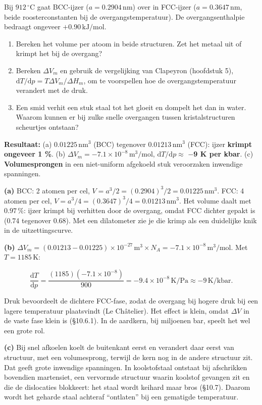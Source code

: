 \begin{oefening}
Bij \(912\,^\circ\mathrm{C}\) gaat BCC-ijzer (\(a = 0.2904\,\mathrm{nm}\)) over in FCC-ijzer (\(a = 0.3647\,\mathrm{nm}\), beide roosterconstanten bij de overgangstemperatuur). De overgangsenthalpie bedraagt ongeveer \(+0.90\,\mathrm{kJ/mol}\).

\begin{enumerate}
\item[(a)]
  Bereken het volume per atoom in beide structuren. Zet het metaal uit of krimpt het bij de overgang?
\item[(b)]
  Bereken \(\Delta V_m\) en gebruik de vergelijking van Clapeyron (hoofdstuk 5), \(\mathrm{d}T/\mathrm{d}p = T\Delta V_m/\Delta H_m\), om te voorspellen hoe de overgangstemperatuur verandert met de druk.
\item[(c)]
  Een smid verhit een stuk staal tot het gloeit en dompelt het dan in water. Waarom kunnen er bij zulke snelle overgangen tussen kristalstructuren scheurtjes ontstaan?
\end{enumerate}
\end{oefening}
\begin{oplossing}
\textbf{Resultaat:} (a) \(0.01225\,\mathrm{nm^3}\) (BCC) tegenover \(0.01213\,\mathrm{nm^3}\) (FCC): ijzer \textbf{krimpt ongeveer 1 \%}. (b) \(\Delta V_m = -7.1\times10^{-8}\,\mathrm{m^3/mol}\), \(\mathrm{d}T/\mathrm{d}p \approx\) \textbf{\ensuremath{-}9 K per kbar}. (c) \textbf{Volumesprongen} in een niet-uniform afgekoeld stuk veroorzaken inwendige spanningen.

\textbf{(a)} BCC: 2 atomen per cel, \(V = a^3/2 = (0.2904)^3/2 = 0.01225\,\mathrm{nm^3}\). FCC: 4 atomen per cel, \(V = a^3/4 = (0.3647)^3/4 = 0.01213\,\mathrm{nm^3}\). Het volume daalt met \(0.97\,\%\): ijzer krimpt bij verhitten door de overgang, omdat FCC dichter gepakt is (0.74 tegenover 0.68). Met een dilatometer zie je die krimp als een duidelijke knik in de uitzettingscurve.

\textbf{(b)} \(\Delta V_m = (0.01213 - 0.01225)\times10^{-27}\,\mathrm{m^3} \times N_A = -7.1\times10^{-8}\,\mathrm{m^3/mol}\). Met \(T = 1185\,\mathrm{K}\):

\[
\frac{\mathrm{d}T}{\mathrm{d}p} = \frac{(1185)(-7.1\times10^{-8})}{900} = -9.4\times10^{-8}\,\mathrm{K/Pa} \approx -9\,\mathrm{K/kbar}.
\]

Druk bevoordeelt de dichtere FCC-fase, zodat de overgang bij hogere druk bij een lagere temperatuur plaatsvindt (Le Châtelier). Het effect is klein, omdat \(\Delta V\) in de vaste fase klein is (§10.6.1). In de aardkern, bij miljoenen bar, speelt het wel een grote rol.

\textbf{(c)} Bij snel afkoelen koelt de buitenkant eerst en verandert daar eerst van structuur, met een volumesprong, terwijl de kern nog in de andere structuur zit. Dat geeft grote inwendige spanningen. In koolstofstaal ontstaat bij afschrikken bovendien martensiet, een vervormde structuur waarin koolstof gevangen zit en die de dislocaties blokkeert: het staal wordt keihard maar bros (§10.7). Daarom wordt het geharde staal achteraf ``ontlaten'' bij een gematigde temperatuur.
\end{oplossing}

